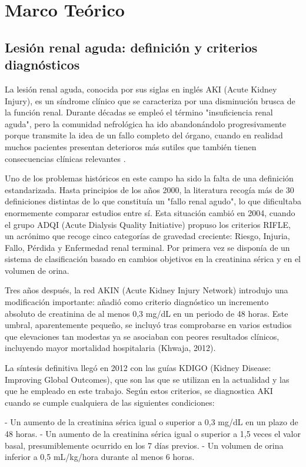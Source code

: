 \documentclass[12pt, a4paper, oneside]{report}
\begin{document}
\chapter{Marco Teórico}
\section{Lesión renal aguda: definición y criterios diagnósticos}

La lesión renal aguda, conocida por sus siglas en inglés AKI (Acute Kidney Injury), es un síndrome clínico que se caracteriza por una disminución brusca de la función renal. Durante décadas se empleó el término "insuficiencia renal aguda", pero la comunidad nefrológica ha ido abandonándolo progresivamente porque transmite la idea de un fallo completo del órgano, cuando en realidad muchos pacientes presentan deterioros más sutiles que también tienen consecuencias clínicas relevantes \parencite{kdigo2012aki}.

Uno de los problemas históricos en este campo ha sido la falta de una definición estandarizada. Hasta principios de los años 2000, la literatura recogía más de 30 definiciones distintas de lo que constituía un "fallo renal agudo", lo que dificultaba enormemente comparar estudios entre sí. Esta situación cambió en 2004, cuando el grupo ADQI (Acute Dialysis Quality Initiative) propuso los criterios RIFLE, un acrónimo que recoge cinco categorías de gravedad creciente: Riesgo, Injuria, Fallo, Pérdida y Enfermedad renal terminal. Por primera vez se disponía de un sistema de clasificación basado en cambios objetivos en la creatinina sérica y en el volumen de orina.

Tres años después, la red AKIN (Acute Kidney Injury Network) introdujo una modificación importante: añadió como criterio diagnóstico un incremento absoluto de creatinina de al menos 0,3 mg/dL en un periodo de 48 horas. Este umbral, aparentemente pequeño, se incluyó tras comprobarse en varios estudios que elevaciones tan modestas ya se asociaban con peores resultados clínicos, incluyendo mayor mortalidad hospitalaria \parencite{khwaja2012kdigo}(Khwaja, 2012).

La síntesis definitiva llegó en 2012 con las guías KDIGO (Kidney Disease: Improving Global Outcomes), que son las que se utilizan en la actualidad y las que he empleado en este trabajo. Según estos criterios, se diagnostica AKI cuando se cumple cualquiera de las siguientes condiciones:

- Un aumento de la creatinina sérica igual o superior a 0,3 mg/dL en un plazo de 48 horas.
- Un aumento de la creatinina sérica igual o superior a 1,5 veces el valor basal, presumiblemente ocurrido en los 7 días previos.
- Un volumen de orina inferior a 0,5 mL/kg/hora durante al menos 6 horas.
\end{document}
